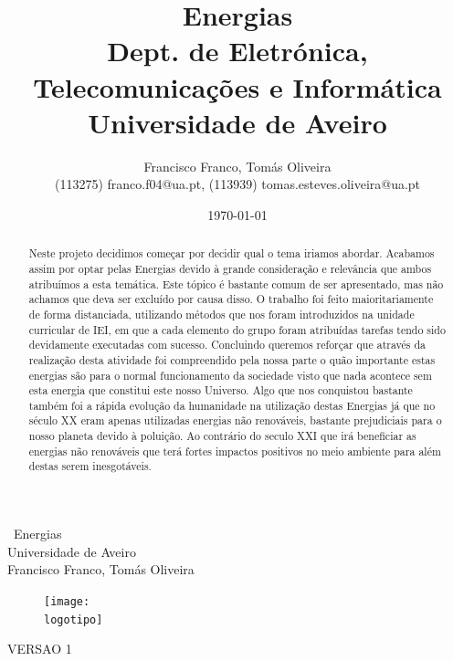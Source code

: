 \documentclass{report}
\begin{document}
%

\def\titulo{Energias}
\def\data{DATA}
\def\autores{Francisco Franco, Tomás Oliveira}
\def\autorescontactos{(113275) franco.f04@ua.pt, (113939) tomas.esteves.oliveira@ua.pt}
\def\versao{VERSAO 1}
\def\departamento{Dept. de Eletrónica, Telecomunicações e Informática}
\def\empresa{Universidade de Aveiro}
\def\logotipo{ua.pdf}
%
%
\begin{titlepage}

\begin{center}
%
\vspace*{50mm}
%
{\Huge \ Energias}\\ 
%
\vspace{10mm}
%
{\Large \empresa}\\
%
\vspace{10mm}
%
{\LARGE \autores}\\ 
%
\vspace{30mm}
%
\begin{figure}[h]
\center
\texttt{[image: \\logotipo]}
\end{figure}
%
\vspace{30mm}
\end{center}
%
\begin{flushright}
\versao
\end{flushright}
\end{titlepage}

\title{%
{\Huge\textbf{\titulo}}\\
{\Large \departamento\\ \empresa}
}
%
\author{%
    \autores \\
    \autorescontactos
}
%
\date{\today}
%
\maketitle
{}

\begin{abstract}
Neste projeto decidimos começar por decidir qual o tema iriamos abordar. Acabamos assim por optar pelas Energias devido à grande consideração e relevância que ambos atribuímos a esta temática. Este tópico é bastante comum de ser apresentado, mas não achamos que deva ser excluído por causa disso. O trabalho foi feito maioritariamente de forma distanciada, utilizando métodos que nos foram introduzidos na unidade curricular de IEI, em que a cada elemento do grupo foram atribuídas tarefas tendo sido devidamente executadas com sucesso. Concluindo queremos reforçar que através da realização desta atividade foi compreendido pela nossa parte o quão importante estas energias são para o normal funcionamento da sociedade visto que nada acontece sem esta energia que constitui este nosso Universo. Algo que nos conquistou bastante também foi a rápida evolução da humanidade na utilização destas Energias já que no século XX eram apenas utilizadas energias não renováveis, bastante prejudiciais para o nosso planeta devido à poluição. Ao contrário do seculo XXI que irá beneficiar as energias não renováveis que terá fortes impactos positivos no meio ambiente para além destas serem inesgotáveis. 
\end{abstract}
\end{document}

